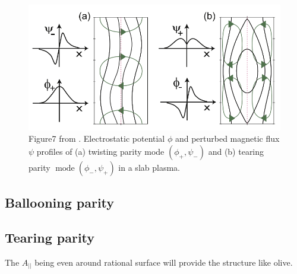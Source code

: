 \begin{figure}[h] \centering
        \includegraphics[width=1\textwidth]{Image/Parity.png}
        \caption{Figure7 from \cite{parity}. Electrostatic potential $\phi$ and perturbed magnetic flux $\psi$ profiles of (a) twisting parity mode $\left(\phi_{+}, \psi_{-}\right)$ and (b) tearing parity $\operatorname{mode}\left(\phi_{-}, \psi_{+}\right)$ in a slab plasma.}
        \label{fig:parity}
\end{figure}


\subsection{Ballooning parity}
\subsection{Tearing parity}

The $A_{||}$ being even around rational surface will provide the structure like olive. 